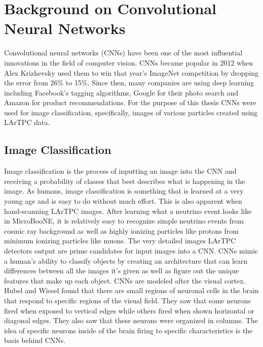 \chapter{Background on Convolutional Neural Networks}\label{ch:cnn}
Convolutional neural networks (CNNs) have been one of the most influential innovations in the field of computer vision. CNNs became popular in 2012 when Alex Krizhevsky used them to win that year's ImageNet competition\cite{ILSVRC15} by dropping the error from 26\% to 15\%. Since then, many companies are using deep learning including Facebook's tagging algorithms, Google for their photo search and Amazon for product recommendations. For the purpose of this thesis CNNs were used for image classification, specifically, images of various particles created using LArTPC data. 

\section{Image Classification} 
Image classification is the process of inputting an image into the CNN and receiving a probability of classes that best describes what is happening in the image. As humans, image classification is something that is learned at a very young age and is easy to do without much effort. This is also apparent when hand-scanning LArTPC images. After learning what a neutrino event looks like in MicroBooNE, it is relatively easy to recognize simple neutrino events from cosmic ray background as well as highly ionizing particles like protons from minimum ionizing particles like muons. The very detailed images LArTPC detectors output are prime candidates for input images into a CNN. CNNs mimic a human's ability to classify objects by creating an architecture that can learn differences between all the images it's given as well as figure out the unique features that make up each object. CNNs are modeled after the visual cortex. Hubel and Wiesel\cite{hubel} found that there are small regions of neuronal cells in the brain that respond to specific regions of the visual field. They saw that some neurons fired when exposed to vertical edges while others fired when shown horizontal or diagonal edges. They also saw that these neurons were organized in columns. The idea of specific neurons inside of the brain firing to specific characteristics is the basis behind CNNs.

